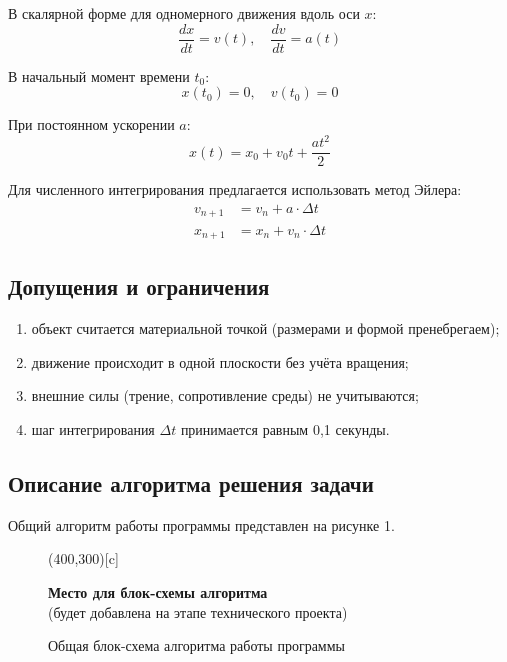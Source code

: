 \documentclass[12pt, a4paper]{article}
\begin{document}
В скалярной форме для одномерного движения вдоль оси $x$:
\begin{equation}
    \frac{dx}{dt} = v(t), \quad \frac{dv}{dt} = a(t)
\end{equation}

В начальный момент времени $t_0$:
\begin{equation}
    x(t_0) = 0, \quad v(t_0) = 0
\end{equation}

При постоянном ускорении $a$:
\begin{equation}
    x(t) = x_0 + v_0 t + \frac{at^2}{2}
\end{equation}

Для численного интегрирования предлагается использовать метод Эйлера:
\begin{align}
    v_{n+1} &= v_n + a \cdot \Delta t \\
    x_{n+1} &= x_n + v_n \cdot \Delta t
\end{align}

\subsection{Допущения и ограничения}
\begin{enumerate}
    \item объект считается материальной точкой (размерами и формой пренебрегаем);
    \item движение происходит в одной плоскости без учёта вращения;
    \item внешние силы (трение, сопротивление среды) не учитываются;
    \item шаг интегрирования $\Delta t$ принимается равным 0,1 секунды.
\end{enumerate}

\subsection{Описание алгоритма решения задачи}

Общий алгоритм работы программы представлен на рисунке 1.

\begin{figure}[h]
    \centering
    \framebox(400,300)[c]{\parbox{12cm}{\centering \textbf{Место для блок-схемы алгоритма} \\ (будет добавлена на этапе технического проекта)}}
    \caption{Общая блок-схема алгоритма работы программы}
    \label{fig:algorithm}
\end{figure}
\end{document}
